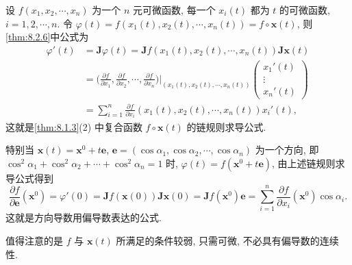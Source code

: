 \begin{example}\label{ex:8.2.3}
设 $f(x_{1}, x_{2}, \cdots, x_{n})$ 为一个 $n$ 元可微函数, 每一个 $x_{i}(t)$ 都为 $t$ 的可微函数, $i = 1, 2, \cdots, n$. 令 $\varphi(t) = f(x_{1}(t), x_{2}(t), \cdots, x_{n}(t)) = f \circ \boldsymbol{x}(t)$, 则\cref{thm:8.2.6}中公式为
\begin{align*}
  \varphi'(t) &= \boldsymbol{J}\varphi(t) = \boldsymbol{J}f(x_{1}(t), x_{2}(t), \cdots, x_{n}(t))\boldsymbol{J}\boldsymbol{x}(t) \\
  &= \Big(\frac{\partial f}{\partial x_{1}}, \frac{\partial f}{\partial x_{2}}, \cdots, \frac{\partial f}{\partial x_{n}}\Big)\Big|_{(x_{1}(t), x_{2}(t), \cdots, x_{n}(t))}\begin{pmatrix} x_{1}'(t) \\ \vdots \\ x_{n}'(t) \end{pmatrix} \\
  &= \sum_{i=1}^{n}\frac{\partial f}{\partial x_{i}}(x_{1}(t), x_{2}(t), \cdots, x_{n}(t))x_{i}'(t),
\end{align*}
这就是\cref{thm:8.1.3}(2) 中复合函数 $f \circ \boldsymbol{x}(t)$ 的链规则求导公式.

特别当 $\boldsymbol{x}(t) = \boldsymbol{x}^{0} + t\boldsymbol{e}$, $\boldsymbol{e} = (\cos\alpha_{1}, \cos\alpha_{2}, \cdots, \cos\alpha_{n})$ 为一个方向, 即 $\cos^{2}\alpha_{1} + \cos^{2}\alpha_{2} + \cdots + \cos^{2}\alpha_{n} = 1$ 时, $\varphi(t) = f(\boldsymbol{x}^{0} + t\boldsymbol{e})$, 由上述链规则求导公式得到
\[
  \frac{\partial f}{\partial \boldsymbol{e}}(\boldsymbol{x}^{0}) = \varphi'(0) = \boldsymbol{J}f(\boldsymbol{x}(0))\boldsymbol{J}\boldsymbol{x}(0) = \boldsymbol{J}f(\boldsymbol{x}^{0})\boldsymbol{e} = \sum_{i=1}^{n}\frac{\partial f}{\partial x_{i}}(\boldsymbol{x}^{0})\cos\alpha_{i}.
\]
这就是方向导数用偏导数表达的公式.

值得注意的是 $f$ 与 $\boldsymbol{x}(t)$ 所满足的条件较弱, 只需可微, 不必具有偏导数的连续性.
\end{example}

